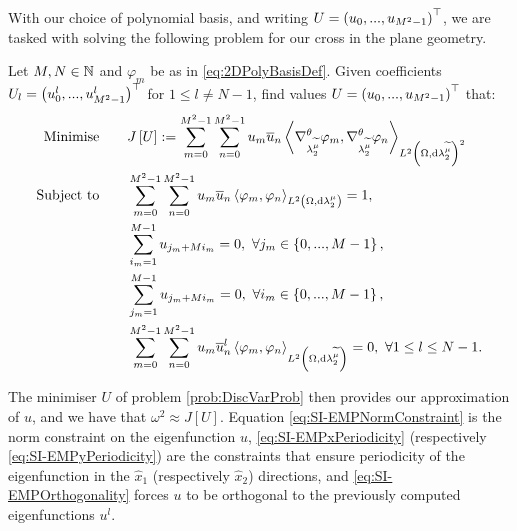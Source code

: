 With our choice of polynomial basis, and writing $U = \left( u_0,...,u_{M^2-1} \right)^\top$, we are tasked with solving the following problem for our cross in the plane geometry.
\begin{problem} \label{prob:DiscVarProb}
	Let $M,N\in\mathbb{N}$ and $\varphi_m$ be as in \eqref{eq:2DPolyBasisDef}.
	Given coefficients $U_l=\left( u^l_0,...,u^l_{M^2-1} \right)^\top$ for $1\leq l\neq N-1$, find values $U=\left( u_0,...,u_{M^2-1} \right)^\top$ that:
	\begin{subequations} \label{eq:SI-ExampleMinProb}
		\begin{align}
			\text{Minimise} \quad & \quad J\left[ U \right] := \sum_{m=0}^{M^2-1}\sum_{n=0}^{M^2-1}u_m\overline{u}_n\left\langle \nabla^{\theta}_{\lambda_2^{\widetilde{\mu}}}\varphi_m , \nabla^{\theta}_{\lambda_2^{\widetilde{\mu}}}\varphi_n \right\rangle_{L^{2}\left( \Omega,\mathrm{d} \lambda_2^{\widetilde{\mu}} \right)^2} 
			\label{eq:SI-EMPObjectiveFn} \\
			\text{Subject to} \quad & \quad \sum_{m=0}^{M^2-1}\sum_{n=0}^{M^2-1}u_m\overline{u}_n\left\langle \varphi_m , \varphi_n \right\rangle_{L^{2}\left( \Omega,\mathrm{d} \lambda_2^{\mu} \right)} = 1, 
			\label{eq:SI-EMPNormConstraint} \\
			& \quad \sum_{i_m=1}^{M-1}u_{j_m+Mi_m} = 0, \ \forall j_m\in\left\{ 0,...,M-1 \right\}, 
			\label{eq:SI-EMPxPeriodicity} \\
			& \quad \sum_{j_m=1}^{M-1}u_{j_m+Mi_m} = 0, \ \forall i_m\in\left\{ 0,...,M-1 \right\},
			\label{eq:SI-EMPyPeriodicity} \\
			& \quad \sum_{m=0}^{M^2-1}\sum_{n=0}^{M^2-1}u_m\overline{u}^l_n\left\langle \varphi_m , \varphi_n \right\rangle_{L^{2}\left( \Omega,\mathrm{d} \lambda_2^{\widetilde{\mu}} \right)} = 0, \ \forall 1\leq l\leq N-1.
			\label{eq:SI-EMPOrthogonality}
		\end{align}
	\end{subequations}
\end{problem}
The minimiser $U$ of problem \ref{prob:DiscVarProb} then provides our approximation of $u$, and we have that $\omega^2 \approx J[U]$.
Equation \eqref{eq:SI-EMPNormConstraint} is the norm constraint on the eigenfunction $u$, \eqref{eq:SI-EMPxPeriodicity} (respectively \eqref{eq:SI-EMPyPeriodicity}) are the constraints that ensure periodicity of the eigenfunction in the $\widehat{x}_1$ (respectively $\widehat{x}_2$) directions, and \eqref{eq:SI-EMPOrthogonality} forces $u$ to be orthogonal to the previously computed eigenfunctions $u^l$.

